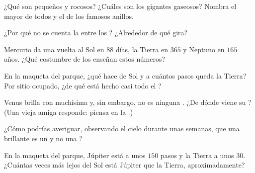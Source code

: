 \begin{exercise}[$\star$]\label{exo:g4:solar-system:3}
¿Qué  son pequeños y rocosos? ¿Cuáles son los gigantes
gaseosos? Nombra el mayor de todos y el de los famosos anillos.
\end{exercise}

\begin{exercise}[$\star$]\label{exo:g4:solar-system:4}
¿Por qué no se cuenta la  entre los ? ¿Alrededor de
qué gira?
\end{exercise}

\begin{exercise}[$\star$]\label{exo:g4:solar-system:5}
Mercurio da una vuelta al Sol en $88$ días, la Tierra en $365$ y
Neptuno en $165$ años. ¿Qué costumbre de los  enseñan estos
números?
\end{exercise}

\begin{exercise}[$\star$]\label{exo:g4:solar-system:6}
En la maqueta del parque, ¿qué hace de Sol y a cuántos pasos queda la
Tierra? Por sitio ocupado, ¿de qué está hecho casi todo el
?
\end{exercise}

\begin{exercise}[$\star$]\label{exo:g4:solar-system:7}
Venus brilla con muchísima  y, sin embargo, no es ninguna
. ¿De dónde viene su ? (Una vieja amiga responde:
piensa en la .)
\end{exercise}

\begin{exercise}[$\star$]\label{exo:g4:solar-system:8}
¿Cómo podrías averiguar, observando el cielo durante unas semanas, que
una  brillante es un  y no una ?
\end{exercise}

\begin{exercise}[$\star$]\label{exo:g4:solar-system:9}
En la maqueta del parque, Júpiter está a unos $150$ pasos y la Tierra
a unos $30$. ¿Cuántas veces más lejos del Sol está Júpiter que la
Tierra, aproximadamente?
\end{exercise}

